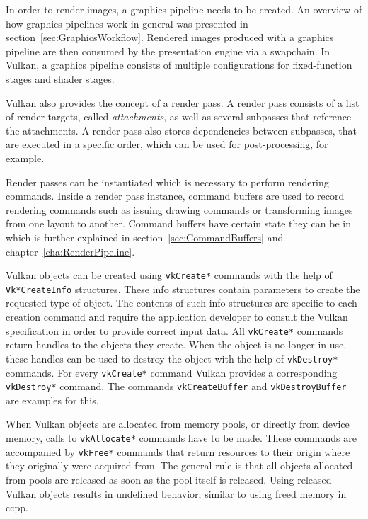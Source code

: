     In order to render images, a graphics pipeline needs to be created.
    An overview of how graphics pipelines work in general was presented in section~\ref{sec:GraphicsWorkflow}.
    Rendered images produced with a graphics pipeline are then consumed by the presentation engine via a swapchain.
    In Vulkan, a graphics pipeline consists of multiple configurations for fixed-function stages and shader stages.

    Vulkan also provides the concept of a render pass.
    A render pass consists of a list of render targets, called \textit{attachments}, as well as several subpasses that reference the attachments.
    A render pass also stores dependencies between subpasses, that are executed in a specific order, which can be used for post-processing, for example.

    Render passes can be instantiated which is necessary to perform rendering commands.
    Inside a render pass instance, command buffers are used to record rendering commands such as issuing drawing commands or transforming images from one layout to another.
    Command buffers have certain state they can be in which is further explained in section~\ref{sec:CommandBuffers} and chapter~\ref{cha:RenderPipeline}.

    Vulkan objects can be created using \lstinline{vkCreate*} commands with the help of \lstinline{Vk*CreateInfo} structures.
    These info structures contain parameters to create the requested type of object.
    The contents of such info structures are specific to each creation command and require the \gls{application} developer to consult the Vulkan specification in order to provide correct input data.
    All \lstinline{vkCreate*} commands return handles to the objects they create.
    When the object is no longer in use, these handles can be used to destroy the object with the help of \lstinline{vkDestroy*} commands.
    For every \lstinline{vkCreate*} command Vulkan provides a corresponding \lstinline{vkDestroy*} command.
    The commands \lstinline{vkCreateBuffer} and \lstinline{vkDestroyBuffer} are examples for this.

    When Vulkan objects are allocated from memory pools, or directly from \gls{device} memory, calls to \lstinline{vkAllocate*} commands have to be made.
    These commands are accompanied by \lstinline{vkFree*} commands that return resources to their origin where they originally were acquired from.
    The general rule is that all objects allocated from pools are released as soon as the pool itself is released.
    Using released Vulkan objects results in undefined behavior, similar to using freed memory in \gls{ccpp}.

